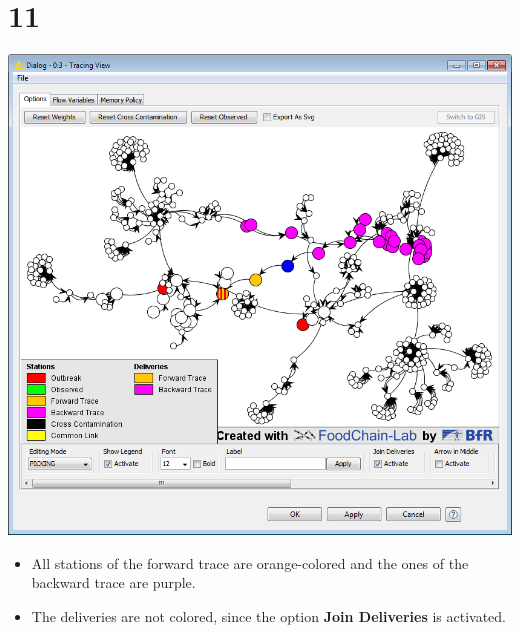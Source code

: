 \documentclass{beamer}
\begin{document}
\section{11}
\begin{frame}
	\begin{center}
  		\includegraphics[height=0.6\textheight]{11.png}
	\end{center}
	\begin{itemize}
		\item All stations of the forward trace are orange-colored and the ones of the backward trace are purple.
		\item The deliveries are not colored, since the option \textbf{Join Deliveries} is activated.
	\end{itemize}
\end{frame}
\end{document}
